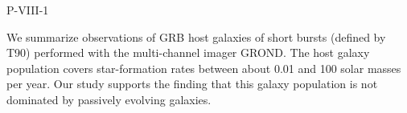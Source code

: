 P-VIII-1


\bigskip



\bigskip

\noindent We summarize observations of GRB host galaxies of short bursts (defined by T90) performed with the multi-channel imager GROND. The host galaxy population covers star-formation rates between about 0.01 and 100 solar masses per year. Our study supports the finding that this galaxy population is not dominated by passively evolving galaxies.
